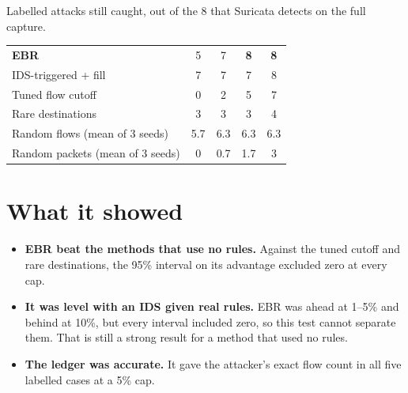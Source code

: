 \begin{gtable}{Labelled attacks still caught, out of the 8 that Suricata detects on the full capture.}
\begin{tabularx}{.78\linewidth}{L c c c c}
\toprule
{} &  &  &  & \\
\midrule
\textbf{EBR} & 5 & 7 & \textbf{8} & \textbf{8}\\
IDS-triggered + fill & 7 & 7 & 7 & 8\\
Tuned flow cutoff & 0 & 2 & 5 & 7\\
Rare destinations & 3 & 3 & 3 & 4\\
Random flows (mean of 3 seeds) & 5.7 & 6.3 & 6.3 & 6.3\\
Random packets (mean of 3 seeds) & 0 & 0.7 & 1.7 & 3\\
\bottomrule
\end{tabularx}
\end{gtable}

\section{What it showed}
\begin{itemize}
\item \textbf{EBR beat the methods that use no rules.} Against the tuned cutoff and rare destinations, the 95\% interval on its advantage excluded zero at every cap.
\item \textbf{It was level with an IDS given real rules.} EBR was ahead at 1--5\% and behind at 10\%, but every interval included zero, so this test cannot separate them. That is still a strong result for a method that used no rules.
\item \textbf{The ledger was accurate.} It gave the attacker's exact flow count in all five labelled cases at a 5\% cap.
\end{itemize}

